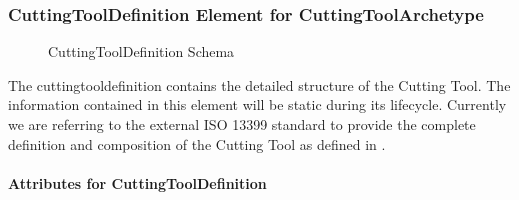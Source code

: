 \documentclass{mtconnect}	%
\begin{document}
\pagebreak

\subsubsection{CuttingToolDefinition Element for CuttingToolArchetype}

\begin{figure}[ht]
  \centering
  \caption{CuttingToolDefinition Schema}
  \label{fig:cuttingtool-definition-schema}
\end{figure}

\FloatBarrier

The \gls{cuttingtooldefinition} contains the detailed structure of the Cutting Tool.  The information contained in this element will be static during its lifecycle.  Currently we are referring to the external ISO 13399 standard to provide the complete definition and composition of the Cutting Tool as defined in . 

\paragraph{Attributes for CuttingToolDefinition}\mbox{}
\end{document}
